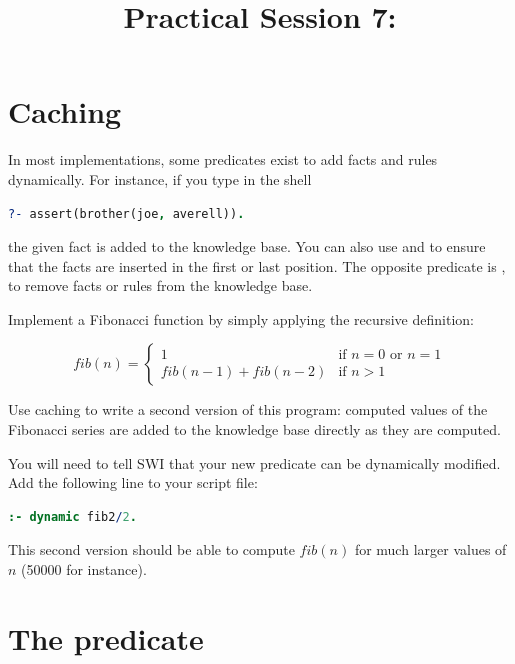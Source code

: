 \documentclass{../../../tp}
\title{Practical Session 7: \prolog}
\author{}
\begin{document}
	
\maketitle

\section{Caching}

In most \prolog implementations, some predicates exist to add facts and rules dynamically. For instance, if you type in the shell

\begin{lstlisting}[language=prolog]
?- assert(brother(joe, averell)).
\end{lstlisting}

the given fact is added to the knowledge base. You can also use  and  to ensure that the facts are inserted in the first or last position. The opposite predicate is , to remove facts or rules from the knowledge base.

\begin{instruction}
	Implement a Fibonacci function by simply applying the recursive definition:
	
	$$fib(n) = \begin{cases}
	1 & \textrm{if $n = 0$ or $n = 1$} \\
	fib(n-1) + fib(n-2)  & \textrm{if $n > 1$}
	\end{cases}$$
	
	Use caching to write a second version of this program: computed values of the Fibonacci series are added to the knowledge base directly as they are computed. 
	
	You will need to tell SWI that your new  predicate can be dynamically modified. Add the following line to your script file:
	
	\begin{lstlisting}[language=prolog]
	:- dynamic fib2/2.
	\end{lstlisting} 
	
	This second version should be able to compute $fib(n)$ for much larger values of $n$ (50000 for instance). 
\end{instruction}
	
\section{The  predicate}	
\end{document}
